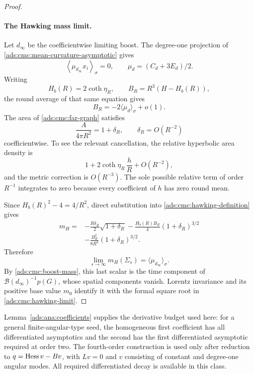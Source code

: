 \begin{proof}
\paragraph{The Hawking mass limit.}
Let \(d_\infty\) be the coefficientwise limiting boost.
The degree-one projection of
\eqref{ads:cmc:mean-curvature-asymptotic} gives
\[
 \left\langle\mu_{d_\infty}x_i\right\rangle_\sigma=0,
 \qquad
 \mu_d=(C_d+3E_d)/2.
\]
Writing
\[
 H_b(R)=2\coth\eta_R,\qquad
 B_R=R^3(H-H_b(R)),
\]
the round average of that same equation gives
\[
 B_R=-2\langle\mu_d\rangle_\sigma+o(1).
\]
The area of \eqref{ads:cmc:far-graph} satisfies
\begin{equation}\label{ads:cmc:area-error}
 \frac{A}{4\pi R^2}=1+\delta_R,\qquad \delta_R=O(R^{-2})
\end{equation}
coefficientwise.  To see the relevant cancellation, the relative
hyperbolic area density is
\[
 1+2\coth\eta_R\,\frac hR+O(R^{-2}),
\]
and the metric correction is \(O(R^{-3})\).  The sole possible
relative term of order \(R^{-1}\) integrates to zero because every
coefficient of \(h\) has zero round mean.

Since \(H_b(R)^2-4=4/R^2\), direct substitution into
\eqref{ads:cmc:hawking-definition} gives
\begin{align*}
 m_H={}&-\frac{R\delta_R}{2}\sqrt{1+\delta_R}
 -\frac{H_b(R)B_R}{4}(1+\delta_R)^{3/2}\\
 &-\frac{B_R^2}{8R^3}(1+\delta_R)^{3/2}.
\end{align*}
Therefore
\[
 \lim_{s\to\infty}m_H(\Sigma_s)
 =\langle\mu_{d_\infty}\rangle_\sigma.
\]
By \eqref{ads:cmc:boost-mass}, this last scalar is the time component of
\(\mathcal B(d_\infty)^{-1}p(G)\), whose spatial components vanish.
Lorentz invariance and its positive base value \(m_0\) identify it
with the formal square root in \eqref{ads:cmc:hawking-limit}.
\end{proof}

\begin{remark}\label{ads:cmc:regularity-budget}
Lemma~\ref{ads:ana:coefficients} supplies the derivative budget used here:
for a general finite-angular-type seed, the homogeneous first
coefficient has all differentiated asymptotics and the second has
the first differentiated asymptotic required at order two.
The fourth-order construction is used only after reduction to
$q=\operatorname{Hess} v-Bv$, with $Lv=0$ and $v$ consisting of constant and
degree-one angular modes. All required differentiated decay is
available in this class.
\end{remark}

